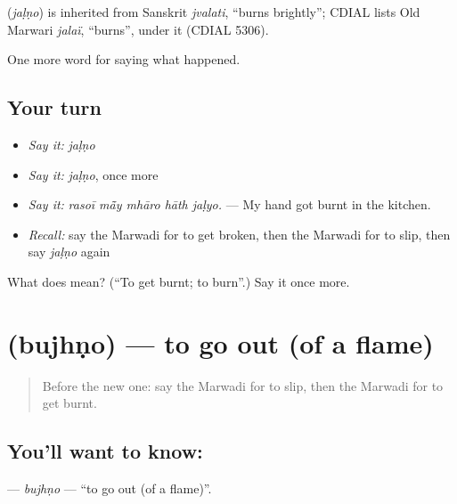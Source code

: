 \begin{cousinweb}
\textbf{} (\emph{jaḷṇo}) is inherited from Sanskrit \emph{jvalati}, \textquotedblleft{}burns brightly\textquotedblright{}; CDIAL lists Old Marwari \emph{jalaï}, \textquotedblleft{}burns\textquotedblright{}, under it (CDIAL 5306).
\end{cousinweb}

\begin{grammarlens}[title={What you've built}]
One more word for saying what happened.
\end{grammarlens}

\subsection*{Your turn}
\begin{itemize}
\raggedright
  \item \emph{Say it:} \emph{jaḷṇo}
  \item \emph{Say it:} \emph{jaḷṇo}, once more
  \item \emph{Say it:} \emph{rasoī mā̃y mhāro hāth jaḷyo.} — My hand got burnt in the kitchen.
  \item \emph{Recall:} say the Marwadi for to get broken, then the Marwadi for to slip, then say \emph{jaḷṇo} again
\end{itemize}

\begin{tcolorbox}[breakable,colback=teal!4,colframe=teal!35!black,title={Before you move on}]
What does  mean? (\textquotedblleft{}To get burnt; to burn\textquotedblright{}.) Say it once more.
\end{tcolorbox}
\section[\texorpdfstring{\mw{बुझणो} (bujhṇo)}{बुझणो (bujhṇo)}]{ (bujhṇo) — to go out (of a flame)}

\label{lesson:MW-C242-bujhno}



\begin{quote}
Before the new one: say the Marwadi for to slip, then the Marwadi for to get burnt.
\end{quote}

\subsection*{You'll want to know: }
\textbf{} — \emph{bujhṇo} — \textquotedblleft{}to go out (of a flame)\textquotedblright{}.

